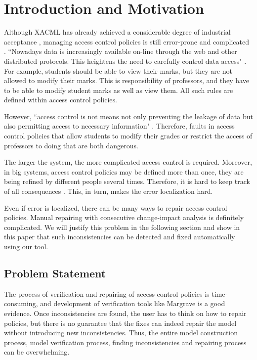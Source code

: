 \documentclass{acm_proc_article-sp}
\begin{document}

\section{Introduction and Motivation}

Although XACML has already achieved a considerable degree of industrial acceptance \cite{acp:alloy}, managing access control policies is still error-prone and complicated \cite{acp:automated}. ``Nowadays data is increasingly available on-line through the web and other distributed protocols. This heightens the need to carefully control data access" \cite{Fisler:2005:VCA:1062455.1062502}. For example, students should be able to view their marks, but they are not allowed to modify their marks. This is responsibility of professors, and they have to be able to modify student marks as well as view them. All such rules are defined within access control policies.

However, ``access control is not means not only preventing the leakage of data but also permitting access to necessary information" \cite{Fisler:2005:VCA:1062455.1062502}. Therefore, faults in access control policies that allow students to modify their grades or restrict the access of professors to doing that are both dangerous.

The larger the system, the more complicated access control is required. Moreover, in big systems, access control policies may be defined more than once, they are being refined by different people several times. Therefore, it is hard to keep track of all consequences \cite{Fisler:2005:VCA:1062455.1062502}. This, in turn, makes the error localization hard.

Even if error is localized, there can be many ways to repair access control policies. Manual repairing with consecutive change-impact analysis is definitely complicated. We will justify this problem in the following section and show in this paper that such inconsistencies can be detected and fixed automatically using our tool.

\subsection{Problem Statement}

The process of verification and repairing of access control policies is time-consuming, and development of verification tools like Margrave \cite{Fisler:2005:VCA:1062455.1062502} is a good evidence. Once inconsistencies are found, the user has to think on how to repair policies, but there is no guarantee that the fixes can indeed repair the model without introducing new inconsistencies. Thus, the entire model construction process, model verification process, finding inconsistencies and repairing process can be overwhelming.
\end{document}
